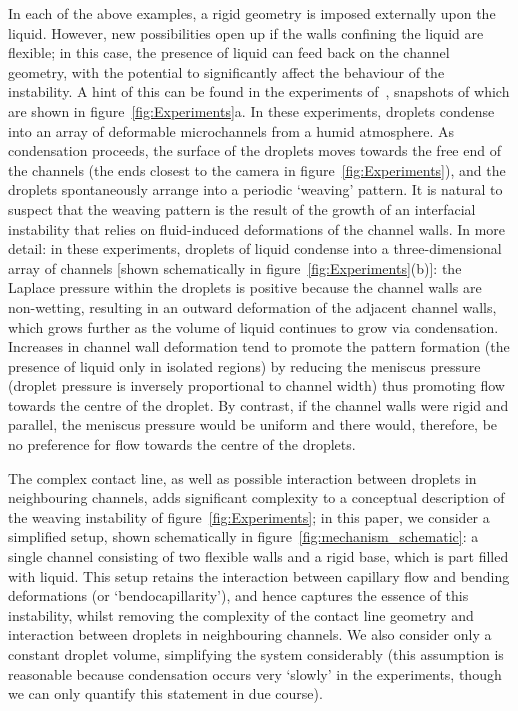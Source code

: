 \documentclass{jfm}
\begin{document}
In each of the above examples, a rigid geometry is imposed externally upon the liquid. However, new possibilities open up if the walls confining the liquid are flexible; in this case, the presence of liquid can feed back on the channel geometry, with the potential to significantly affect the behaviour of the instability. %
A hint of this can be found in the experiments of~\citet{Seemann2011JPhysCondMat}, snapshots of which are shown in figure~\ref{fig:Experiments}a. In these experiments, droplets condense into an array of deformable microchannels from a humid atmosphere. As condensation proceeds, the surface of the droplets moves towards the free end of the channels (the ends closest to the camera in figure~\ref{fig:Experiments}), and the droplets spontaneously arrange into a periodic `weaving' pattern. It is natural to suspect that the weaving pattern is the result of the growth of an interfacial instability that relies on fluid-induced deformations of the channel walls. In more detail: in these experiments, droplets of liquid condense into a three-dimensional array of channels [shown schematically in figure~\ref{fig:Experiments}(b)]: the Laplace pressure within the droplets is positive because the channel walls are non-wetting, resulting in an outward deformation of the adjacent channel walls, which grows further as the volume of liquid continues to grow via condensation. Increases in channel wall deformation tend to promote the pattern formation (the presence of liquid only in isolated regions) by reducing the meniscus pressure (droplet pressure is inversely proportional to channel width) thus promoting flow towards the centre of the droplet. By contrast, if the channel walls were rigid and parallel, the meniscus pressure would be uniform and there would, therefore, be no preference for flow towards the centre of the droplets. 

The complex contact line, as well as possible interaction between droplets in neighbouring channels, adds significant complexity to a conceptual description of the weaving instability of figure~\ref{fig:Experiments}; in this paper, we consider a simplified setup, shown schematically in figure~\ref{fig:mechanism_schematic}: a single channel consisting of two flexible walls and a rigid base, which is part filled with liquid. This setup retains the interaction between capillary flow and bending deformations (or `bendocapillarity'), and hence captures the essence of this instability, whilst removing the complexity of the contact line geometry and interaction between droplets in neighbouring channels. We also consider only a constant droplet volume, simplifying the system considerably (this assumption is reasonable because condensation occurs very `slowly' in the experiments, though we can only quantify this statement in due course).
\end{document}
